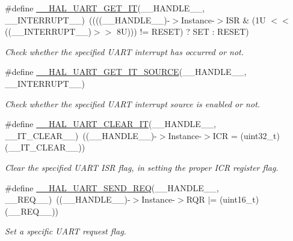 \begin{DoxyCompactItemize}
\#define \mbox{\hyperlink{group___u_a_r_t___exported___macros_ga89c4cb1b623c15cfdea2c0a864c8b1e4}{\+\_\+\+\_\+\+H\+A\+L\+\_\+\+U\+A\+R\+T\+\_\+\+G\+E\+T\+\_\+\+IT}}(\+\_\+\+\_\+\+H\+A\+N\+D\+L\+E\+\_\+\+\_\+,  \+\_\+\+\_\+\+I\+N\+T\+E\+R\+R\+U\+P\+T\+\_\+\+\_\+)~((((\+\_\+\+\_\+\+H\+A\+N\+D\+L\+E\+\_\+\+\_\+)-\/$>$Instance-\/$>$I\+SR \& (1\+U $<$$<$ ((\+\_\+\+\_\+\+I\+N\+T\+E\+R\+R\+U\+P\+T\+\_\+\+\_\+)$>$$>$ 8\+U))) != R\+E\+S\+E\+T) ? S\+E\+T \+: R\+E\+S\+E\+T)
\begin{DoxyCompactList}\small\item\em Check whether the specified U\+A\+RT interrupt has occurred or not. \end{DoxyCompactList}\item 
\#define \mbox{\hyperlink{group___u_a_r_t___exported___macros_gab53dbf1d75f241330428bf426b2963d1}{\+\_\+\+\_\+\+H\+A\+L\+\_\+\+U\+A\+R\+T\+\_\+\+G\+E\+T\+\_\+\+I\+T\+\_\+\+S\+O\+U\+R\+CE}}(\+\_\+\+\_\+\+H\+A\+N\+D\+L\+E\+\_\+\+\_\+,  \+\_\+\+\_\+\+I\+N\+T\+E\+R\+R\+U\+P\+T\+\_\+\+\_\+)
\begin{DoxyCompactList}\small\item\em Check whether the specified U\+A\+RT interrupt source is enabled or not. \end{DoxyCompactList}\item 
\#define \mbox{\hyperlink{group___u_a_r_t___exported___macros_gaa81e0f2503bd2a699e7e478507946bb2}{\+\_\+\+\_\+\+H\+A\+L\+\_\+\+U\+A\+R\+T\+\_\+\+C\+L\+E\+A\+R\+\_\+\+IT}}(\+\_\+\+\_\+\+H\+A\+N\+D\+L\+E\+\_\+\+\_\+,  \+\_\+\+\_\+\+I\+T\+\_\+\+C\+L\+E\+A\+R\+\_\+\+\_\+)~((\+\_\+\+\_\+\+H\+A\+N\+D\+L\+E\+\_\+\+\_\+)-\/$>$Instance-\/$>$I\+CR = (uint32\+\_\+t)(\+\_\+\+\_\+\+I\+T\+\_\+\+C\+L\+E\+A\+R\+\_\+\+\_\+))
\begin{DoxyCompactList}\small\item\em Clear the specified U\+A\+RT I\+SR flag, in setting the proper I\+CR register flag. \end{DoxyCompactList}\item 
\#define \mbox{\hyperlink{group___u_a_r_t___exported___macros_ga568a15495a9e2a9d230474b9e8bcc8e4}{\+\_\+\+\_\+\+H\+A\+L\+\_\+\+U\+A\+R\+T\+\_\+\+S\+E\+N\+D\+\_\+\+R\+EQ}}(\+\_\+\+\_\+\+H\+A\+N\+D\+L\+E\+\_\+\+\_\+,  \+\_\+\+\_\+\+R\+E\+Q\+\_\+\+\_\+)~((\+\_\+\+\_\+\+H\+A\+N\+D\+L\+E\+\_\+\+\_\+)-\/$>$Instance-\/$>$R\+QR $\vert$= (uint16\+\_\+t)(\+\_\+\+\_\+\+R\+E\+Q\+\_\+\+\_\+))
\begin{DoxyCompactList}\small\item\em Set a specific U\+A\+RT request flag. \end{DoxyCompactList}\item 

\end{DoxyCompactItemize}
